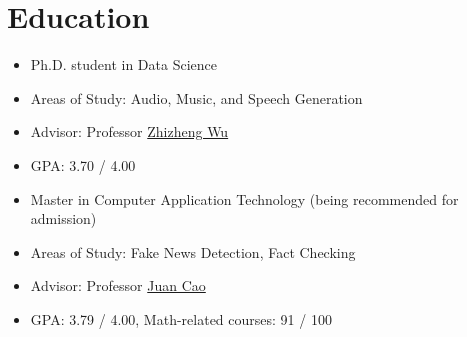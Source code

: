 \documentclass{resume}
\begin{document}




\section{Education}
{
  \small
  \begin{itemize}
    \item Ph.D. student in Data Science
    \item Areas of Study: Audio, Music, and Speech Generation
    \item Advisor: Professor
          \href{https://scholar.google.com/citations?user=K6zhweAAAAAJ&hl=en}{Zhizheng
            Wu}
    \item GPA: 3.70 / 4.00
  \end{itemize}
}

{
  \small
  \begin{itemize}
    \item Master in Computer Application Technology (being recommended for admission)
    \item Areas of Study: Fake News Detection, Fact Checking
    \item Advisor: Professor
          \href{https://scholar.google.com/citations?user=fSBdNg0AAAAJ&hl=zh-CN}{Juan
            Cao}
    \item GPA: 3.79 / 4.00, Math-related courses: 91 / 100
  \end{itemize}
}
\end{document}
